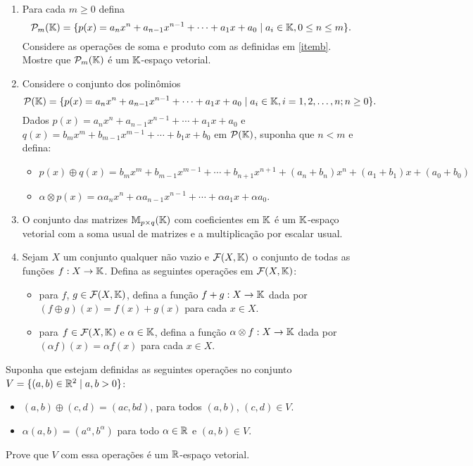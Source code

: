 \documentclass[12pt]{exam}
\begin{document}
\begin{exercicio}
\begin{enumerate}[label={\alph*})]
    \item Para cada $m \ge 0$ defina
    \[
      \mathcal{P}_m(\mathbb{K}) = \{ p(x) = a_nx^n + a_{n - 1}x^{n - 1} + \cdots + a_1x + a_0 \mid a_i \in \mathbb{K}, 0 \le n \le m \}.
    \]
    Considere as opera\c{c}\~oes de soma e produto com as definidas em \ref{itemb}. Mostre que $\mathcal{P}_m(\mathbb{K})$ é um $\mathbb{K}$-espaço vetorial.
    
    \item Considere o conjunto dos polin\^omios
    \[
      \mathcal{P}(\mathbb{K}) = \{ p(x) = a_nx^n + a_{n - 1}x^{n - 1} + \cdots + a_1x + a_0 \mid a_i \in \mathbb{K}, i = 1, 2, \dots, n; n \ge 0 \}.
    \]
    Dados $p(x) = a_nx^n + a_{n - 1}x^{n - 1} + \cdots + a_1x + a_0$ e $q(x) = b_mx^m + b_{m - 1}x^{m - 1} + \cdots + b_1x + b_0$ em $\mathcal{P}(\mathbb{K})$, suponha que $n < m$ e defina:
    \begin{itemize}
      \item $p(x) \oplus q(x) = b_mx^m + b_{m - 1}x^{m - 1} + \cdots + b_{n + 1}x^{n + 1} + (a_n + b_n)x^n + (a_1 + b_1)x + (a_0 + b_0)$
      \item $\alpha\otimes p(x) = \alpha a_nx^n + \alpha a_{n - 1}x^{n - 1} + \cdots + \alpha a_1x + \alpha a_0$.
    \end{itemize}

    \item O conjunto das matrizes $\mathbb{M}_{p \times q}(\mathbb{K})$ com coeficientes em $\mathbb{K}$ \'e um $\mathbb{K}$-espa\c{c}o vetorial com a soma usual de matrizes e a multiplica\c{c}\~ao por escalar usual.

    \item Sejam $X$ um conjunto qualquer n\~ao vazio e $\mathcal{F}(X, \mathbb{K})$ o conjunto de todas as fun\c{c}\~oes $f : X \to \mathbb{K}$. Defina as seguintes opera\c{c}\~oes em $\mathcal{F}(X, \mathbb{K})$:
    \begin{itemize}
      \item  para $f$, $g \in \mathcal{F}(X, \mathbb{K})$, defina a fun\c{c}\~ao $f + g : X \to \mathbb{K}$ dada por $(f\oplus g)(x) = f(x) + g(x)$ para cada $x \in X$.
      \item para $f \in \mathcal{F}(X, \mathbb{K})$ e $\alpha \in \mathbb{K}$, defina a fun\c{c}\~ao $\alpha \otimes f: X \to \mathbb{K}$ dada por $(\alpha f)(x) = \alpha f(x)$ para cada $x \in X$.
    \end{itemize}
  \end{enumerate}
\end{exercicio}

\begin{exercicio}
  Suponha que estejam definidas as seguintes opera\c{c}\~oes no conjunto $V = \{(a, b) \in \mathbb{R}^2 \mid a, b > 0\}$:
  \begin{itemize}
    \item $(a, b) \oplus (c, d) = (ac, bd)$, para todos $(a,b)$, $(c,d) \in V$.
    \item $\alpha (a, b) = (a^\alpha, b^\alpha)$ para todo $\alpha \in \mathbb{R}$ e $(a, b) \in V$.
  \end{itemize}
  Prove que $V$ com essa opera\c{c}\~oes \'e um $\mathbb{R}$-espa\c{c}o vetorial.
\end{exercicio}
\end{document}
